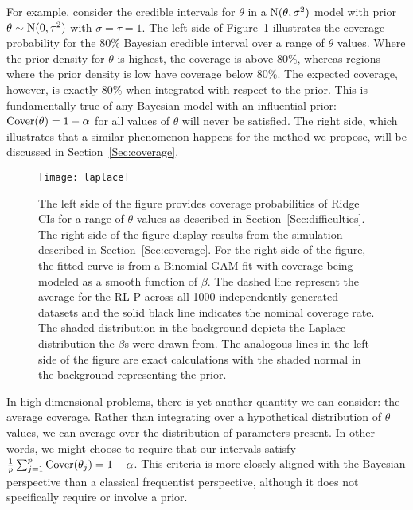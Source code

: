 For example, consider the credible intervals for $\theta$ in a $\textrm{N}(\theta, \sigma^2)$ model with prior $\theta \sim \textrm{N}(0, \tau^2)$ with $\sigma = \tau = 1$. The left side of Figure~\ref{Fig:laplace} illustrates the coverage probability for the 80\% Bayesian credible interval over a range of $\theta$ values. Where the prior density for $\theta$ is highest, the coverage is above 80\%, whereas regions where the prior density is low have coverage below 80\%. The expected coverage, however, is exactly 80\% when integrated with respect to the prior. This is fundamentally true of any Bayesian model with an influential prior: $\textrm{Cover}(\theta) = 1 - \alpha$ for all values of $\theta$ will never be satisfied. The right side, which illustrates that a similar phenomenon happens for the method we propose, will be discussed in Section~\ref{Sec:coverage}.

\begin{figure}[htb!]
  \begin{center}
  \texttt{[image: laplace]}
  \caption{\label{Fig:laplace} The left side of the figure provides coverage probabilities of Ridge CIs for a range of $\theta$ values as described in Section~\ref{Sec:difficulties}. The right side of the figure display results from the simulation described in Section~\ref{Sec:coverage}. For the right side of the figure, the fitted curve is from a Binomial GAM fit with coverage being modeled as a smooth function of $\beta$. The dashed line represent the average for the RL-P across all 1000 independently generated datasets and the solid black line indicates the nominal coverage rate. The shaded distribution in the background depicts the Laplace distribution the $\beta$s were drawn from. The analogous lines in the left side of the figure are exact calculations with the shaded normal in the background representing the prior.}
  \end{center}
\end{figure}

In high dimensional problems, there is yet another quantity we can consider: the average coverage. Rather than integrating over a hypothetical distribution of $\theta$ values, we can average over the distribution of parameters present. In other words, we might choose to require that our intervals satisfy $\tfrac{1}{p} \sum_{j=1}^p \textrm{Cover}(\theta_j) = 1-\alpha$. This criteria is more closely aligned with the Bayesian perspective than a classical frequentist perspective, although it does not specifically require or involve a prior.

